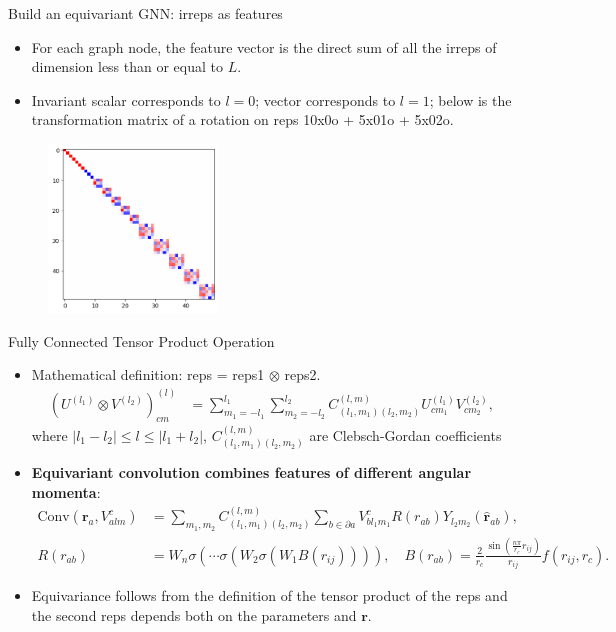 \begin{frame}{Build an equivariant GNN: irreps as features}
    \begin{itemize}
        \item For each graph node, the feature vector is the direct sum of all the irreps of dimension
        less than or equal to $L$.
        \item Invariant scalar corresponds to $l=0$; vector corresponds to $l=1$; below
        is the transformation matrix of a rotation on reps 10x0o + 5x01o + 5x02o.
    \end{itemize}
    \begin{figure}
        \includegraphics[width=0.4\textwidth]{figures/irreps.jpg}
    \end{figure}
\end{frame}
 

\begin{frame}{Fully Connected Tensor Product Operation}
    \begin{itemize}
        \item Mathematical definition: reps = reps1 $\otimes$ reps2.
        \begin{align*}
            (U^{(l_1)} \otimes V^{(l_2)})^{(l)}_{cm} &=
            \sum_{m_1=-l_1}^{l_1} \sum_{m_2=-l_2}^{l_2}
            C^{(l,m)}_{(l_1,m_1)(l_2,m_2)} U^{(l_1)}_{cm_1}
            V^{(l_2)}_{cm_2},
        \end{align*}
        where $|l_1 - l_2| \leq l \leq |l_1 + l_2|$,
        $C^{(l,m)}_{(l_1,m_1)(l_2,m_2)}$ are Clebsch-Gordan coefficients
        \item {\color{red}\textbf{Equivariant convolution combines features of different angular momenta}}:
        \begin{align*}
            \text{Conv}(\mathbf{r}_a, V_{alm}^c) &=
            \sum_{m_1, m_2}
            C^{(l,m)}_{(l_1,m_1)(l_2,m_2)} \sum_{b \in \partial a}
            V_{bl_1m_1}^c R(r_{ab})Y_{l_2m_2}(\hat{\mathbf{r}}_{ab}),   \\
            R(r_{ab}) &= W_n\sigma(\cdots \sigma(W_2\sigma(W_1 B(r_{ij})))), \quad
            B(r_{ab}) = \frac{2}{r_c}\frac{\sin(\frac{n\pi}{r_c}r_{ij})}{r_{ij}}
            f(r_{ij}, r_c).
        \end{align*}
        \item Equivariance follows from the definition of the tensor product of the
        reps and the second reps depends both on the parameters and $\mathbf{r}$.
    \end{itemize}
\end{frame}


